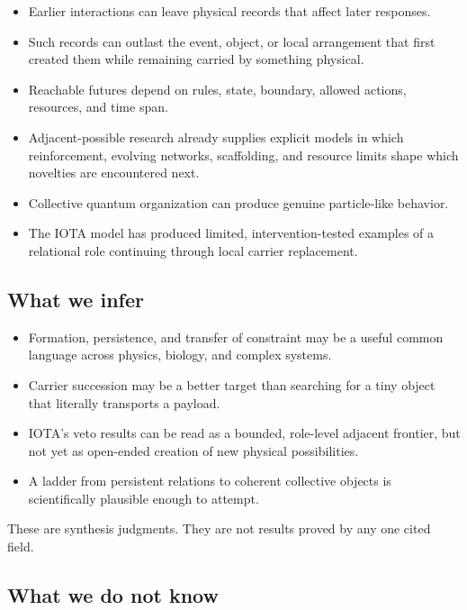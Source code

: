 \documentclass[11pt]{article}
\begin{document}
\begin{itemize}
  \item Earlier interactions can leave physical records that affect later
  responses.
  \item Such records can outlast the event, object, or local arrangement that
  first created them while remaining carried by something physical.
  \item Reachable futures depend on rules, state, boundary, allowed actions,
  resources, and time span.
  \item Adjacent-possible research already supplies explicit models in which
  reinforcement, evolving networks, scaffolding, and resource limits shape
  which novelties are encountered next.
  \item Collective quantum organization can produce genuine particle-like
  behavior.
  \item The IOTA model has produced limited, intervention-tested examples of a
  relational role continuing through local carrier replacement.
\end{itemize}

\subsection*{What we infer}

\begin{itemize}
  \item Formation, persistence, and transfer of constraint may be a useful
  common language across physics, biology, and complex systems.
  \item Carrier succession may be a better target than searching for a tiny
  object that literally transports a payload.
  \item IOTA's veto results can be read as a bounded, role-level adjacent
  frontier, but not yet as open-ended creation of new physical possibilities.
  \item A ladder from persistent relations to coherent collective objects is
  scientifically plausible enough to attempt.
\end{itemize}

These are synthesis judgments. They are not results proved by any one cited
field.

\subsection*{What we do not know}
\end{document}
